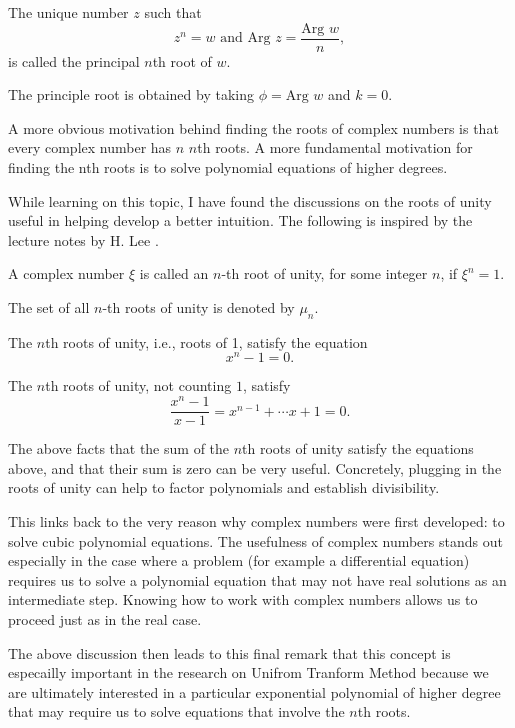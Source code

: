 \documentclass[11pt,reqno,oneside,a4paper]{article}
\begin{document}
\begin{defn}
	The unique number $z$ such that 
	$$z^n =w \text{ and Arg }z = \frac{\text{Arg }w}{n},$$
	is called the principal $n$th root of $w$.
	
	The principle root is obtained by taking $\phi = \text{Arg }w$ and $k=0$. 
\end{defn}

A more obvious motivation behind finding the roots of complex numbers is that every complex number has $n$ $n$th roots. A more fundamental motivation for finding the nth roots is to solve polynomial equations of higher degrees. 

While learning on this topic, I have found the discussions on the roots of unity useful in helping develop a better intuition. The following is inspired by the lecture notes by H. Lee \cite{Lee2015a}. 

\begin{defn}
	A complex number $\xi$ is called an $n$-th root of unity, for some integer $n$, if $\xi^n = 1.$
	
	The set of all $n$-th roots of unity is denoted by $\mu_n.$
\end{defn}

The $n$th roots of unity, i.e., roots of 1, satisfy the equation
$$x^n -1 = 0.$$

The $n$th roots of unity, not counting $1$, satisfy
$$\frac{x^n -1 }{x-1} = x^{n-1} + \cdots x+ 1 = 0.$$

The above facts that the sum of the $n$th roots of unity satisfy the equations above, and that their sum is zero can be very useful. Concretely, plugging in the roots of unity can help to factor polynomials and establish divisibility.

This links back to the very reason why complex numbers were first developed: to solve cubic polynomial equations. The usefulness of complex numbers stands out especially in the case where a problem (for example a differential equation) requires us to solve a polynomial equation that may not have real solutions as an intermediate step. Knowing how to work with complex numbers allows us to proceed just as in the real case. 

The above discussion then leads to this final remark that this concept is especailly important in the research on Unifrom Tranform Method because we are ultimately interested in a particular exponential polynomial of higher degree that may require us to solve equations that involve the $n$th roots. 
\end{document}
